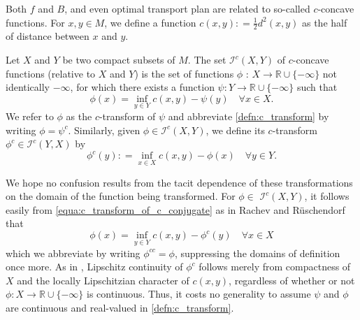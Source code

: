Both $f$ and $B$, and even optimal transport plan are related to so-called $c$-concave functions.
For $x,y \in M$, we define a function $c(x,y): = \frac{1}{2} d^2(x,y)$ as the half of distance between $x$ and $y$.

\begin{defn} 
	Let \( X \) and \( Y \) be two compact subsets of \( M \).
	The set \( \mathcal{I} ^ { c } ( X , Y ) \) of \( c \)-concave functions (relative to \( X \) and \( Y \)) is
	the set of functions \( \phi \) : \( X \rightarrow \mathbb { R } \cup \{ - \infty \} \) not identically \( - \infty \),
	for which there exists a function \( \psi : Y \rightarrow \mathbb { R } \cup \{ - \infty \} \) such that
	\begin{equation}
		\label{defn:c_transform}
		\phi ( x ) = \inf _ { y \in Y } c ( x , y ) - \psi ( y ) \quad \forall x \in X.
	\end{equation}
	We refer to \( \phi \) as the \( c \)-transform of \( \psi \) and abbreviate \cref{defn:c_transform}
	by writing \( \phi = \psi ^ { c } \).
	Similarly, given \( \phi \in \mathcal{I} ^ { c } ( X , Y ) \),
	we define its \( c \)-transform \( \phi ^ { c } \in \mathcal{I} ^ { c } ( Y , X ) \) by
	\begin{equation}
		\label{equa:c_transform_of_c_conjugate}
		\phi ^ { c } ( y ) : = \inf _ { x \in X } c ( x , y ) - \phi ( x ) \quad \forall y \in Y.
	\end{equation}
\end{defn}

We hope no confusion results from the tacit dependence of
these transformations on the domain of the function being transformed.
For \( \phi \in \) \( \mathcal { I } ^ { c } ( X , Y ) \),
it follows easily from \cref{equa:c_transform_of_c_conjugate} as in Rachev and Rüschendorf
\cite[Section 3.3]{Rachev1998} that
\[ \phi ( x ) = \inf _ { y \in Y } c ( x , y ) - \phi ^ { c } ( y ) \quad \forall x \in X \]
which we abbreviate by writing \( \phi ^ { c c } = \phi \), suppressing the domains of definition once more.
As in \cite{mccann2001polar}, Lipschitz continuity of \( \phi ^ { c } \) follows merely from
compactness of \( X \) and the locally Lipschitzian character of \( c ( x , y ) \),
regardless of whether or not \( \phi : X \rightarrow \mathbb { R } \cup \{ - \infty \} \) is continuous.
Thus, it costs no generality to
assume \( \psi \) and \( \phi \) are continuous and real-valued in \cref{defn:c_transform}.

